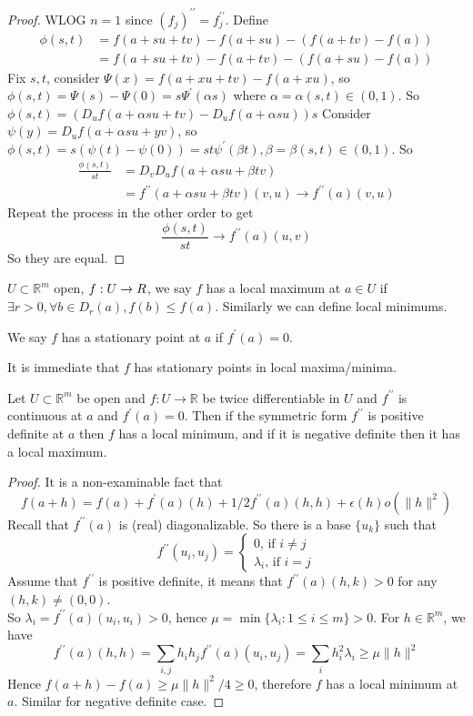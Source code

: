 \begin{proof}
    WLOG $n=1$ since $(f_j)^{\prime\prime}=f^{\prime\prime}_j$.
    Define
    \begin{align*}
        \phi(s,t)&=f(a+su+tv)-f(a+su)-(f(a+tv)-f(a))\\
        &=f(a+su+tv)-f(a+tv)-(f(a+su)-f(a))
    \end{align*}
    Fix $s,t$, consider $\Psi(x)=f(a+xu+tv)-f(a+xu)$, so $\phi(s,t)=\Psi(s)-\Psi(0)=s\Psi^\prime(\alpha s)$ where $\alpha=\alpha(s,t)\in (0,1)$.
    So $\phi(s,t)=(D_uf(a+\alpha su+tv)-D_uf(a+\alpha su))s$
    Consider $\psi(y)=D_uf(a+\alpha su+yv)$, so $\phi(s,t)=s(\psi(t)-\psi(0))=st\psi^\prime(\beta t),\beta=\beta(s,t)\in (0,1)$.
    So
    \begin{align*}
        \frac{\phi(s,t)}{st}&=D_vD_uf(a+\alpha su+\beta tv)\\
        &=f^{\prime\prime}(a+\alpha su+\beta tv)(v,u)\to f^{\prime\prime}(a)(v,u)
    \end{align*}
    Repeat the process in the other order to get
    $$\frac{\phi(s,t)}{st}\to f^{\prime\prime}(a)(u,v)$$
    So they are equal.
\end{proof}
$U\subset\mathbb R^m$ open, $f:U\to\mathbb\mathbb R$, we say $f$ has a local maximum at $a\in U$ if $\exists r>0,\forall b\in D_r(a),f(b)\le f(a)$.
Similarly we can define local minimums.
\begin{definition}
    We say $f$ has a stationary point at $a$ if $f^\prime(a)=0$.
\end{definition}
It is immediate that $f$ has stationary points in local maxima/minima.
\begin{theorem}
    Let $U\subset\mathbb R^m$ be open and $f:U\to\mathbb R$ be twice differentiable in $U$ and $f^{\prime\prime}$ is continuous at $a$ and $f^\prime(a)=0$.
    Then if the symmetric form $f^{\prime\prime}$ is positive definite at $a$ then $f$ has a local minimum, and if it is negative definite then it has a local maximum.
\end{theorem}
\begin{proof}
    It is a non-examinable fact that
    $$f(a+h)=f(a)+f^\prime(a)(h)+1/2f^{\prime\prime}(a)(h,h)+\epsilon(h)o(\|h\|^2)$$
    Recall that $f^{\prime\prime}(a)$ is (real) diagonalizable.
    So there is a base $\{u_k\}$ such that
    $$f^{\prime\prime}(u_i,u_j)=\begin{cases}
        0\text{, if $i\neq j$}\\
        \lambda_i\text{, if $i=j$}
    \end{cases}$$
    Assume that $f^{\prime\prime}$ is positive definite, it means that $f^{\prime\prime}(a)(h,k)>0$ for any $(h,k)\neq (0,0)$.\\
    So $\lambda_i=f^{\prime\prime}(a)(u_i,u_i)>0$, hence $\mu=\min\{\lambda_i:1\le i\le m\}>0$.
    For $h\in\mathbb R^m$, we have
    $$f^{\prime\prime}(a)(h,h)=\sum_{i,j}h_ih_jf^{\prime\prime}(a)(u_i,u_j)=\sum_ih_i^2\lambda_i\ge\mu\|h\|^2$$
    Hence $f(a+h)-f(a)\ge \mu\|h\|^2/4\ge 0$, therefore $f$ has a local minimum at $a$.
    Similar for negative definite case.
\end{proof}